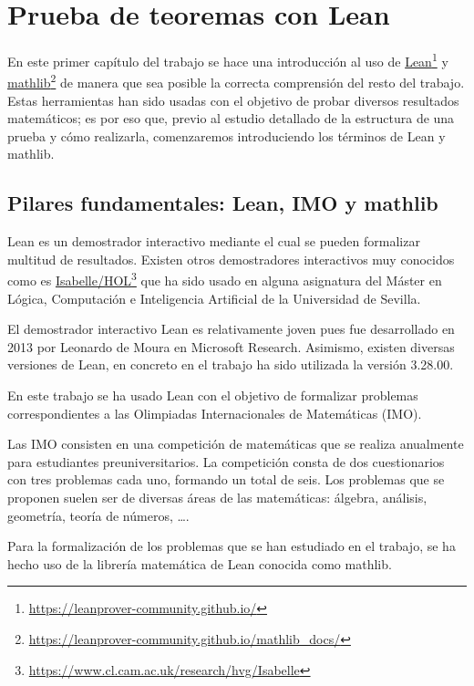 \chapter{Prueba de teoremas con Lean}\label{cap1}

En este primer capítulo del trabajo se hace una introducción al uso de
\href{https://leanprover-community.github.io/}{Lean}\footnote{\url{https://leanprover-community.github.io/}} y
\href{https://leanprover-community.github.io/mathlib_docs/}{mathlib}\footnote{\url{https://leanprover-community.github.io/mathlib_docs/}}
de manera que sea posible la correcta comprensión del resto del
trabajo. Estas herramientas han sido usadas con el objetivo de probar
diversos resultados matemáticos; es por eso que, previo al estudio
detallado de la estructura de una prueba y cómo realizarla, comenzaremos
introduciendo los términos de Lean y mathlib.

\section{Pilares fundamentales: Lean, IMO y mathlib}

Lean es un demostrador interactivo mediante el cual se pueden formalizar
multitud de resultados. Existen otros demostradores interactivos muy
conocidos como es
\href{https://www.cl.cam.ac.uk/research/hvg/Isabelle/index.html}{Isabelle/HOL}\footnote{\url{https://www.cl.cam.ac.uk/research/hvg/Isabelle}}
que ha sido usado en alguna asignatura
del Máster en Lógica, Computación e Inteligencia Artificial de la
Universidad de Sevilla.

El demostrador interactivo Lean es relativamente joven pues fue
desarrollado en 2013 por Leonardo de Moura en Microsoft
Research. Asimismo, existen diversas versiones de Lean, en concreto en
el trabajo ha sido utilizada la versión 3.28.00.

En este trabajo se ha usado Lean con el objetivo de formalizar problemas
correspondientes a las Olimpiadas Internacionales de Matemáticas (IMO).

Las IMO consisten en una competición de matemáticas que se realiza
anualmente para estudiantes preuniversitarios. La competición consta de
dos cuestionarios con tres problemas cada uno, formando un total de
seis. Los problemas que se proponen suelen ser de diversas áreas de las
matemáticas: álgebra, análisis, geometría, teoría de números, \dots.

Para la formalización de los problemas que se han estudiado en el
trabajo, se ha hecho uso de la librería matemática de Lean conocida como
mathlib.

